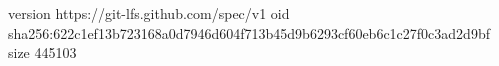 version https://git-lfs.github.com/spec/v1
oid sha256:622c1ef13b723168a0d7946d604f713b45d9b6293cf60eb6c1c27f0c3ad2d9bf
size 445103
